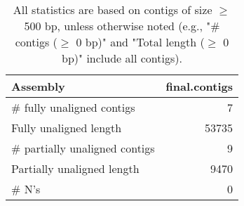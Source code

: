 \documentclass[12pt,a4paper]{article}
\begin{document}
\begin{table}[ht]
\begin{center}
\caption{All statistics are based on contigs of size $\geq$ 500 bp, unless otherwise noted (e.g., "\# contigs ($\geq$ 0 bp)" and "Total length ($\geq$ 0 bp)" include all contigs).}
\begin{tabular}{|l*{1}{|r}|}
\hline
Assembly & final.contigs \\ \hline
\# fully unaligned contigs & 7 \\ \hline
Fully unaligned length & 53735 \\ \hline
\# partially unaligned contigs & 9 \\ \hline
Partially unaligned length & 9470 \\ \hline
\# N's & 0 \\ \hline
\end{tabular}
\end{center}
\end{table}
\end{document}
